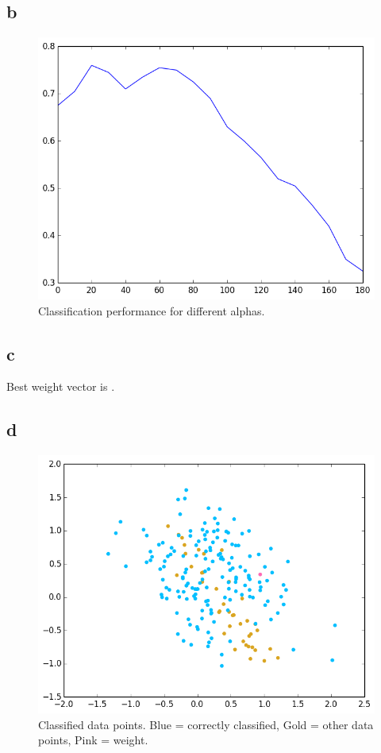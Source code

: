 \documentclass[11pt,a4paper]{article}
\begin{document}
\subsection*{b}
\begin{figure}[h]
\centering
 \includegraphics[width=\textwidth]{./2_2_b.png}
\caption{Classification performance for different alphas.}
\end{figure}

\subsection*{c}
Best weight vector is .

\subsection*{d}
\begin{figure}[h]
\centering
 \includegraphics[width=\textwidth]{./2_2_d.png}
\caption{Classified data points. Blue = correctly classified, Gold = other data points, Pink = weight.}
\end{figure}
\end{document}
